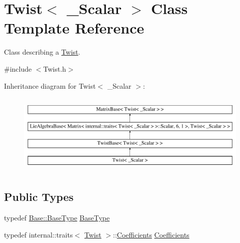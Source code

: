 \hypertarget{class_twist}{}\section{Twist$<$ \+\_\+\+Scalar $>$ Class Template Reference}
\label{class_twist}


Class describing a \hyperlink{class_twist}{Twist}.  




{\ttfamily \#include $<$Twist.\+h$>$}

Inheritance diagram for Twist$<$ \+\_\+\+Scalar $>$\+:\begin{figure}[H]
\begin{center}
\leavevmode
\includegraphics[height=3.943662cm]{class_twist}
\end{center}
\end{figure}
\subsection*{Public Types}
\begin{DoxyCompactItemize}
\item 
typedef \hyperlink{class_twist_base_a4086aa35326778872a7d0f0bfdfcc0ec}{Base\+::\+Base\+Type} \hyperlink{class_twist_ab1df1af2243738177191f6c23123f3be}{Base\+Type}
\item 
typedef internal\+::traits$<$ \hyperlink{class_twist}{Twist} $>$\+::\hyperlink{class_twist_a1bc0976a0f06b366421639350134222b}{Coefficients} \hyperlink{class_twist_a1bc0976a0f06b366421639350134222b}{Coefficients}
\end{DoxyCompactItemize}
